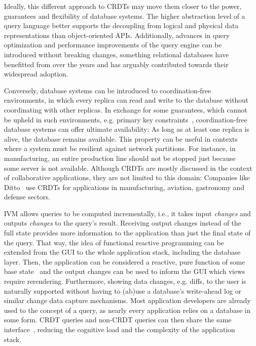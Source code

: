 Ideally, this different approach to \acp{CRDT} may move them closer to the power,
guarantees and flexibility of database systems.
The higher abstraction level of a query language better supports the decoupling
from logical and physical data representations than object-oriented \acsp{API}.
Additionally, advances in query optimization and performance improvements
of the query engine can be introduced without breaking changes,
something relational databases have benefitted from over the years and
has arguably contributed towards their widespread adoption.

Conversely, database systems can be introduced to coordination-free environments,
in which every replica can read and write to the database without
coordinating with other replicas.
In exchange for some guarantees, which cannot be upheld in such environments,
e.g. primary key constraints~\cite{bailis2014coordination},
coordination-free database systems can offer ultimate availability:
As long as at least one replica is alive, the database remains available.
This property can be useful in contexts where a system must be resilient
against network partitions.
For instance, in manufacturing, an entire production line should not be stopped
just because some server is not available.
Although \acp{CRDT} are mostly discussed in the context of collaborative
applications, they are not limited to this domain:
Companies like Ditto~\cite{dittoinc} use \acp{CRDT} for applications in
manufacturing, aviation, gastronomy and defense sectors.

\ac{IVM} allows queries to be computed incrementally, i.e., it takes input
\emph{changes} and outputs \emph{changes} to the query's result.
Receiving output changes instead of the full state provides more information
to the application than just the final state of the query.
That way, the idea of functional reactive programming can be extended from
the \acs{GUI} to the whole application stack, including the database layer.
Then, the application can be considered a reactive, pure function
of some base state~\cite{litt2023riffle} and the output changes can be used
to inform the \ac{GUI} which views require rerendering.
Furthermore, showing data changes, e.g. diffs, to the user is naturally supported
without having to (ab)use a database's write-ahead log or similar change
data capture mechanisms.
Most application developers are already used to the concept of a query,
as nearly every application relies on a database in some form.
\ac{CRDT} queries and non-\ac{CRDT} queries can then share the
same interface~\cite{litt2023riffle},
reducing the cognitive load and the complexity of the application stack.

